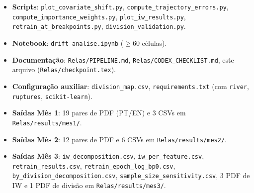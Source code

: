 \documentclass[11pt,a4paper]{article}
\begin{document}
\begin{itemize}[leftmargin=1.4em,itemsep=1pt,parsep=0pt]
    \item \textbf{Scripts}: \texttt{plot\_covariate\_shift.py},
          \texttt{compute\_trajectory\_errors.py},
          \texttt{compute\_importance\_weights.py},
          \texttt{plot\_iw\_results.py},
          \texttt{retrain\_at\_breakpoints.py},
          \texttt{division\_validation.py}.
    \item \textbf{Notebook}: \texttt{drift\_analise.ipynb} ($\geq$60 c\'elulas).
    \item \textbf{Documenta\c{c}\~ao}: \texttt{Relas/PIPELINE.md},
          \texttt{Relas/CODEX\_CHECKLIST.md}, este arquivo
          (\texttt{Relas/checkpoint.tex}).
    \item \textbf{Configura\c{c}\~ao auxiliar}: \texttt{division\_map.csv},
          \texttt{requirements.txt} (com \texttt{river}, \texttt{ruptures},
          \texttt{scikit-learn}).
    \item \textbf{Sa\'idas M\^es 1}: 19 pares de PDF (PT/EN) e 3 CSVs em
          \texttt{Relas/results/mes1/}.
    \item \textbf{Sa\'idas M\^es 2}: 12 pares de PDF e 6 CSVs em
          \texttt{Relas/results/mes2/}.
    \item \textbf{Sa\'idas M\^es 3}: \texttt{iw\_decomposition.csv},
          \texttt{iw\_per\_feature.csv}, \texttt{retrain\_results.csv},
          \texttt{retrain\_epoch\_log\_bp0.csv},
          \texttt{by\_division\_decomposition.csv},
          \texttt{sample\_size\_sensitivity.csv}, 3 PDF de IW e 1 PDF de
          divis\~ao em \texttt{Relas/results/mes3/}.
\end{itemize}
\end{document}
